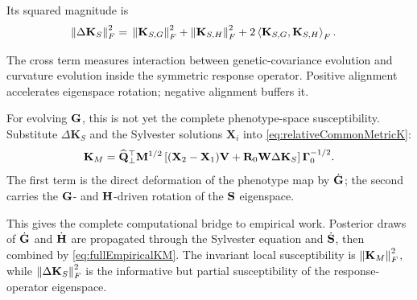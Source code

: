 Its squared magnitude is
\begin{align}
\left\lVert \Delta\mathbf K_S\right\rVert_F^2
={}&\left\lVert \mathbf K_{S,G}\right\rVert_F^2
+\left\lVert \mathbf K_{S,H}\right\rVert_F^2
+2\left\langle \mathbf K_{S,G},\mathbf K_{S,H}\right\rangle_F.
\label{eq:susceptibilityPartition}
\end{align}

\inwords The cross term measures interaction between genetic-covariance evolution and curvature evolution inside the symmetric response operator. Positive alignment accelerates eigenspace rotation; negative alignment buffers it.

For evolving \(\mathbf{G}\), this is not yet the complete phenotype-space susceptibility. Substitute \(\Delta\mathbf K_S\) and the Sylvester solutions \(\mathbf X_i\) into \cref{eq:relativeCommonMetricK}:
\begin{equation}
\mathbf K_M
=\widehat{\mathbf{Q}}_{\perp}^{\top}\mathbf{M}^{1/2}
\left[(\mathbf X_2-\mathbf X_1)\mathbf{V}
+\mathbf R_0\mathbf{W}\Delta\mathbf K_S\right]
\boldsymbol\Gamma_0^{-1/2}.
\label{eq:fullEmpiricalKM}
\end{equation}
The first term is the direct deformation of the phenotype map by \(\dot{\mathbf{G}}\); the second carries the \(\mathbf{G}\)- and \(\mathbf{H}\)-driven rotation of the \(\mathbf{S}\) eigenspace.

\begin{connectionbox}
This gives the complete computational bridge to empirical work. Posterior draws of \(\dot{\mathbf{G}}\) and \(\dot{\mathbf{H}}\) are propagated through the Sylvester equation and \(\dot{\mathbf{S}}\), then combined by \cref{eq:fullEmpiricalKM}. The invariant local susceptibility is \(\left\lVert \mathbf K_M\right\rVert_F^2\), while \(\left\lVert \Delta\mathbf K_S\right\rVert_F^2\) is the informative but partial susceptibility of the response-operator eigenspace.
\end{connectionbox}
